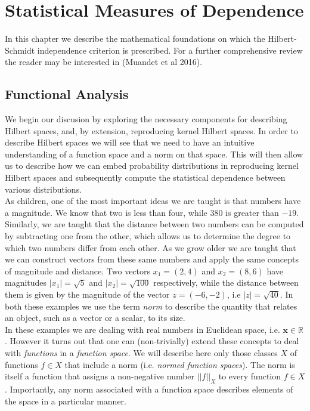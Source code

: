 \chapter{Statistical Measures of Dependence}
\label{hsic}

In this chapter we describe the mathematical foundations on which the Hilbert-Schmidt independence criterion is prescribed. For a further comprehensive review the reader may be interested in (Muandet et al 2016). 

\section{Functional Analysis}

We begin our discusion by exploring the necessary components for describing Hilbert spaces, and, by extension, reproducing kernel Hilbert spaces. In order to describe Hilbert spaces we will see that we need to have an intuitive understanding of a function space and a norm on that space. This will then allow us to describe how we can embed probability distributions in reproducing kernel Hilbert spaces and subsequently compute the statistical dependence between various distributions.\\

As children, one of the most important ideas we are taught is that numbers have a magnitude. We know that two is less than four, while $380$ is greater than $-19$. Similarly, we are taught that the distance between two numbers can be computed by subtracting one from the other, which allows us to determine the degree to which two numbers differ from each other. As we grow older we are taught that we can construct vectors from these same numbers and apply the same concepts of magnitude and distance. Two vectors $x_1 = (2, 4)$ and $x_2 = (8, 6)$ have magnitudes $|x_1| = \sqrt{5}$ and $|x_2| = \sqrt{100}$ respectively, while the distance between them is given by the magnitude of the vector $z = (-6, -2)$, i.e $|z| = \sqrt{40}$. In both these examples we use the term \textit{norm} to describe the quantity that relates an object, such as a vector or a scalar, to its size. \\

In these examples we are dealing with real numbers in Euclidean space, i.e. $\textbf{x} \in \mathbb{R}$. However it turns out that one can (non-trivially) extend these concepts to deal with \textit{functions} in a \textit{function space}. We will describe here only those classes $X$ of functions $f \in X$ that include a norm (i.e. \textit{normed function spaces}). The norm is itself a function that assigns a non-negative number $||f||_X$ to every function $f \in X$. Importantly, any norm associated with a function space describes elements of the space in a particular manner.  

